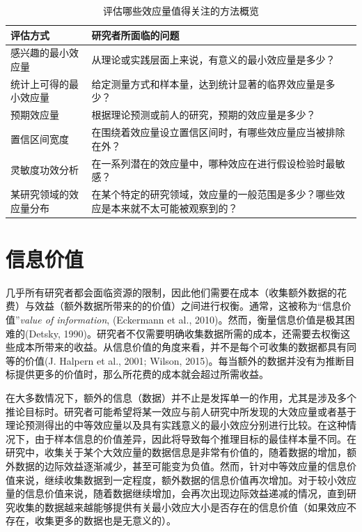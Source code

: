 \documentclass[
  letterpaper,
  DIV=11,
  numbers=noendperiod]{scrreprt}
\begin{document}
\hypertarget{tbl-table-effect-eval}{}
\begin{table}
\caption{\label{tbl-table-effect-eval}评估哪些效应量值得关注的方法概览 }\tabularnewline

\centering
\begin{tabular}{>{\raggedright\arraybackslash}p{5cm}|>{\raggedright\arraybackslash}p{10cm}}
\hline
评估方式 & 研究者所面临的问题\\
\hline
感兴趣的最小效应量 & 从理论或实践层面上来说，有意义的最小效应量是多少？\\
\hline
统计上可得的最小效应量 & 给定测量方式和样本量，达到统计显著的临界效应量是多少？\\
\hline
预期效应量 & 根据理论预测或前人的研究，预期的效应量是多少？\\
\hline
置信区间宽度 & 在围绕着效应量设立置信区间时，有哪些效应量应当被排除在外？\\
\hline
灵敏度功效分析 & 在一系列潜在的效应量中，哪种效应在进行假设检验时最敏感？\\
\hline
某研究领域的效应量分布 & 在某个特定的研究领域，效应量的一般范围是多少？哪些效应是本来就不太可能被观察到的？\\
\hline
\end{tabular}
\end{table}

\hypertarget{ux4fe1ux606fux4ef7ux503c}{%
\section{信息价值}\label{ux4fe1ux606fux4ef7ux503c}}

几乎所有研究者都会面临资源的限制，因此他们需要在成本（收集额外数据的花费）与效益（额外数据所带来的的价值）之间进行权衡。通常，这被称为``信息价值''\emph{value
of information}, (Eckermann et al.,
2010)。然而，衡量信息价值是极其困难的(Detsky,
1990)。研究者不仅需要明确收集数据所需的成本，还需要去权衡这些成本所带来的收益。从信息价值的角度来看，并不是每个可收集的数据都具有同等的价值(J.
Halpern et al., 2001; Wilson,
2015)。每当额外的数据并没有为推断目标提供更多的价值时，那么所花费的成本就会超过所需收益。

在大多数情况下，额外的信息（数据）并不止是发挥单一的作用，尤其是涉及多个推论目标时。研究者可能希望将某一效应与前人研究中所发现的大效应量或者基于理论预测得出的中等效应量以及具有实践意义的最小效应分别进行比较。在这种情况下，由于样本信息的价值差异，因此将导致每个推理目标的最佳样本量不同。在研究中，收集关于某个大效应量的数据信息是非常有价值的，随着数据的增加，额外数据的边际效益逐渐减少，甚至可能变为负值。然而，针对中等效应量的信息价值来说，继续收集数据到一定程度，额外数据的信息价值再次增加。对于较小效应量的信息价值来说，随着数据继续增加，会再次出现边际效益递减的情况，直到研究收集的数据越来越能够提供有关最小效应大小是否存在的信息价值（如果效应不存在，收集更多的数据也是无意义的）。
\end{document}
